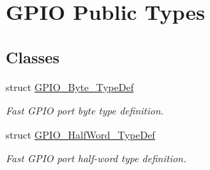 \hypertarget{group___g_p_i_o___public___types}{\section{\-G\-P\-I\-O \-Public \-Types}
\label{group___g_p_i_o___public___types}
}
\subsection*{\-Classes}
\begin{DoxyCompactItemize}
\item 
struct \hyperlink{struct_g_p_i_o___byte___type_def}{\-G\-P\-I\-O\-\_\-\-Byte\-\_\-\-Type\-Def}
\begin{DoxyCompactList}\small\item\em \-Fast \-G\-P\-I\-O port byte type definition. \end{DoxyCompactList}\item 
struct \hyperlink{struct_g_p_i_o___half_word___type_def}{\-G\-P\-I\-O\-\_\-\-Half\-Word\-\_\-\-Type\-Def}
\begin{DoxyCompactList}\small\item\em \-Fast \-G\-P\-I\-O port half-\/word type definition. \end{DoxyCompactList}\end{DoxyCompactItemize}
